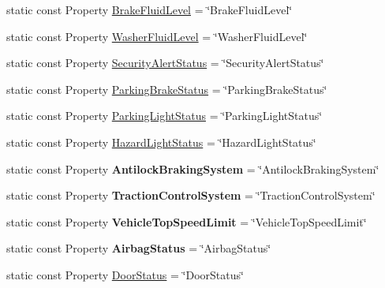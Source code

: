 \begin{DoxyCompactItemize}
\item 
static const Property \hyperlink{classVehicleProperty_a83bc635222e9ba14dfa134defa21e825}{Brake\-Fluid\-Level} = \char`\"{}Brake\-Fluid\-Level\char`\"{}
\item 
static const Property \hyperlink{classVehicleProperty_a37c8c7e827625705d2f560ab53ee8d23}{Washer\-Fluid\-Level} = \char`\"{}Washer\-Fluid\-Level\char`\"{}
\item 
static const Property \hyperlink{classVehicleProperty_a7bc28af663879a2ac9145e5b97a5da4f}{Security\-Alert\-Status} = \char`\"{}Security\-Alert\-Status\char`\"{}
\item 
static const Property \hyperlink{classVehicleProperty_a848ad7334c7aa14709fe2e8c3a1b2608}{Parking\-Brake\-Status} = \char`\"{}Parking\-Brake\-Status\char`\"{}
\item 
static const Property \hyperlink{classVehicleProperty_a505ffc37974f674df55a97c27a7ba0b7}{Parking\-Light\-Status} = \char`\"{}Parking\-Light\-Status\char`\"{}
\item 
static const Property \hyperlink{classVehicleProperty_a21058071101327c72251e2e09e24cb67}{Hazard\-Light\-Status} = \char`\"{}Hazard\-Light\-Status\char`\"{}
\item 
\hypertarget{classVehicleProperty_ab3ed7359914eb1aad8aff1a3409b1f0c}{static const Property {\bfseries Antilock\-Braking\-System} = \char`\"{}Antilock\-Braking\-System\char`\"{}}\label{classVehicleProperty_ab3ed7359914eb1aad8aff1a3409b1f0c}

\item 
\hypertarget{classVehicleProperty_a16b20920ac636662cc4accacde1a434f}{static const Property {\bfseries Traction\-Control\-System} = \char`\"{}Traction\-Control\-System\char`\"{}}\label{classVehicleProperty_a16b20920ac636662cc4accacde1a434f}

\item 
\hypertarget{classVehicleProperty_aa33a83620bfe2ece493a8e8e7e1fdbcc}{static const Property {\bfseries Vehicle\-Top\-Speed\-Limit} = \char`\"{}Vehicle\-Top\-Speed\-Limit\char`\"{}}\label{classVehicleProperty_aa33a83620bfe2ece493a8e8e7e1fdbcc}

\item 
\hypertarget{classVehicleProperty_a341a783cf4746bb7388ee460e62c309e}{static const Property {\bfseries Airbag\-Status} = \char`\"{}Airbag\-Status\char`\"{}}\label{classVehicleProperty_a341a783cf4746bb7388ee460e62c309e}

\item 
\hypertarget{classVehicleProperty_aec1cd341d1eda388b27e5e2c167f377b}{static const Property \hyperlink{classVehicleProperty_aec1cd341d1eda388b27e5e2c167f377b}{Door\-Status} = \char`\"{}Door\-Status\char`\"{}}\label{classVehicleProperty_aec1cd341d1eda388b27e5e2c167f377b}


\end{DoxyCompactItemize}
